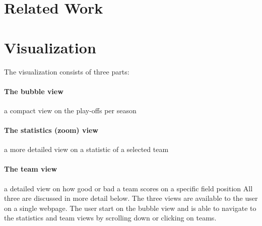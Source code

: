\documentclass{sigchi}
\begin{document}
\section{Related Work}\label{sec:literature}


\section{Visualization}\label{sec:visualization}
The visualization consists of three parts:
\paragraph{The bubble view} a compact view on the play-offs per season
\paragraph{The statistics (zoom) view} a more detailed view on a statistic of a selected 
team
\paragraph{The team view} a detailed view on how good or bad a team scores on a specific 
field position
All three are discussed in more detail below. The three views are available to
the user on a single webpage. The user start on the bubble view and is able to
navigate to the statistics and team views by scrolling down or clicking on
teams.
\end{document}

